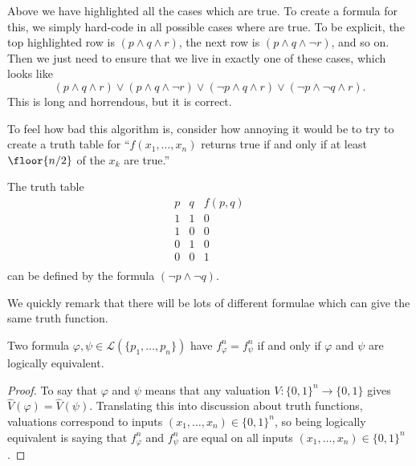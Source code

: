 Above we have highlighted all the cases which are true. To create a formula for this, we simply hard-code in all possible cases where are true. To be explicit, the top highlighted row is $(p\land q\land r)$, the next row is $(p\land q\land\lnot r)$, and so on. Then we just need to ensure that we live in exactly one of these cases, which looks like
\[(p\land q\land r)\lor(p\land q\land\lnot r)\lor(\lnot p\land q\land r)\lor(\lnot p\land\lnot q\land r).\]
This is long and horrendous, but it is correct.
\begin{remark}
	To feel how bad this algorithm is, consider how annoying it would be to try to create a truth table for ``$f(x_1,\ldots,x_n)$ returns true if and only if at least $\floor{n/2}$ of the $x_k$ are true.''
\end{remark}
\begin{example}
	The truth table
	\[\begin{array}{c|c||c}
		p & q & f(p,q) \\
		\hline
		1 & 1 & 0 \\
		1 & 0 & 0 \\
		0 & 1 & 0 \\
		0 & 0 & 1 \\
	\end{array}\]
	can be defined by the formula $(\lnot p\land\lnot q)$.
\end{example}
We quickly remark that there will be lots of different formulae which can give the same truth function.
\begin{lemma}
	Two formula $\varphi,\psi\in\mathcal L(\{p_1,\ldots,p_n\})$ have $f^n_\varphi=f^n_\psi$ if and only if $\varphi$ and $\psi$ are logically equivalent.
\end{lemma}
\begin{proof}
	To say that $\varphi$ and $\psi$ means that any valuation $V:\{0,1\}^n\to\{0,1\}$ gives $\hat V(\varphi)=\hat V(\psi)$. Translating this into discussion about truth functions, valuations correspond to inputs $(x_1,\ldots,x_n)\in\{0,1\}^n$, so being logically equivalent is saying that $f^n_\varphi$ and $f^n_\psi$ are equal on all inputs $(x_1,\ldots,x_n)\in\{0,1\}^n$.
\end{proof}